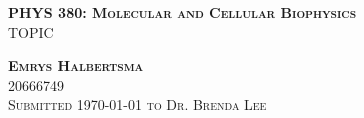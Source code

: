 \begin{titlepage}
\begin{center}
    \vspace*{90mm}
    \fontsize{10mm}{10mm} 
    \textsc{\textbf{PHYS 380: Molecular and Cellular Biophysics}\vspace{4mm} \\\hline
     \vspace{4mm}
    TOPIC}
\end{center}

\vspace*{25mm}

\begin{center}
    \textsc{
    \huge{\textbf{Emrys Halbertsma}\\}
    \huge{20666749\\}
    \vspace{4mm}
	\Large{Submitted \today{} to Dr. Brenda Lee}}
\end{center}

\pagebreak

\end{titlepage}
